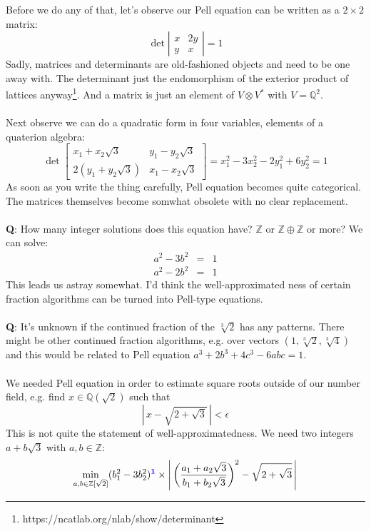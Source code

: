 \documentclass[12pt]{article}
\begin{document}
Before we do any of that, let's observe our Pell equation can be written as a $2 \times 2$ matrix:
$$ \det \left|\begin{array}{cc} x & 2y \\ y & x \end{array} \right| = 1$$
Sadly, matrices and determinants are old-fashioned objects and need to be one away with.  The determinant just the endomorphism of the exterior product of lattices anyway\footnote{https://ncatlab.org/nlab/show/determinant}. And a matrix is just an element of $V \otimes V^*$ with $V = \mathbb{Q}^2$.\\ \\
Next observe we can do a quadratic form in four variables, elements of a quaterion algebra:
$$ \det \left[ \begin{array}{cc} x_1 + x_2 \sqrt{3} & y_1 - y_2 \sqrt{3} \\
2(y_1 + y_2 \sqrt{3}) & x_1 - x_2 \sqrt{3} \end{array}\right] = x_1^2 - 3x_2^2 - 2y_1^2 + 6 y_2^2 = 1 $$
As soon as you write the thing carefully, Pell equation becomes quite categorical.  The matrices themselves become somwhat obsolete with no clear replacement. \\ \\
\textbf{Q}: How many integer solutions does this equation have?  $\mathbb{Z}$ or $\mathbb{Z} \oplus \mathbb{Z}$ or more?  We can solve:
\begin{eqnarray*}
a^2 - 3b^2 &=& 1 \\
a^2 - 2b^2 &=& 1
\end{eqnarray*}
This leads us astray somewhat.  I'd think the well-approximated ness of certain fraction algorithms can be turned into Pell-type equations. \\ \\
\textbf{Q}: It's unknown if the continued fraction of the $\sqrt[3]{2}$ has any patterns.  There might be other continued fraction algorithms, e.g. over vectors $(1, \sqrt[3]{2}, \sqrt[3]{4})$ and this would be related to Pell equation $a^3 + 2b^3 + 4c^3 - 6abc = 1$. \\ \\
\noindent We needed Pell equation in order to estimate square roots outside of our number field, e.g. find $x \in \mathbb{Q}(\sqrt{2})$ such that  
$$ \left|\,x - \sqrt{2 + \sqrt{3}}\,\right| < \epsilon $$
This is not quite the statement of well-approximatedness.  We need two integers $a + b \sqrt{3}$ with $a,b \in \mathbb{Z}$:
$$ \min_{a,b \in \mathbb{Z}[\sqrt{2}]} (b_1^2 - 3b_2^2)^{\color{blue}\mathbf{1}} \times \left|\,\left( \frac{a_1 + a_2\sqrt{3}}{b_1 + b_2\sqrt{3}}\right)^2 - \sqrt{2 + \sqrt{3}}\,\right| $$
\end{document}
